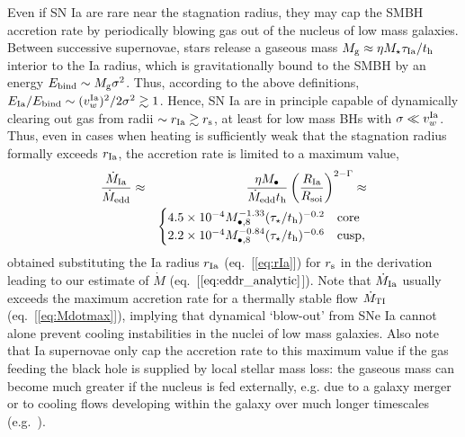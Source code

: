 \documentclass[usenatbib,fleqn]{mn2e}
\newcommand{\Mbheight}{M_{\bullet,8}}
\begin{document}
Even if SN Ia are rare near the stagnation radius, they may cap the
SMBH accretion rate by periodically blowing gas out of the nucleus of
low mass galaxies.  Between successive supernovae, stars release a
gaseous mass $M_{\rm g} \approx \eta M_{\star}\tau_{\rm Ia}/t_{\rm h}$
interior to the Ia radius, which is gravitationally bound to the SMBH
by an energy $E_{\rm bind} \sim M_{\rm g}\sigma^{2}$.  Thus, according
to the above definitions, $E_{\rm Ia}/E_{\rm bind} \sim (v_{w}^{\rm
  Ia})^{2}/2\sigma^{2} \gtrsim 1$.  Hence, SN Ia are in principle
capable of dynamically clearing out gas from radii $\sim r_{\rm Ia}
\gtrsim r_{\rm s}$, at least for low mass BHs with $\sigma \ll v^{\rm
  Ia}_{w}$.  Thus, even in cases when heating is sufficiently weak
that the stagnation radius formally exceeds $r_{\rm Ia}$, the
accretion rate is limited to a maximum value,
\begin{eqnarray}
\frac{\dot{M}_{\rm Ia}}{\dot{M}_{\rm edd}} &\approx& \frac{\eta M_{\bullet}}{\dot{M}_{\rm edd} t_{\rm h}}\left(\frac{R_{\rm Ia}}{R_{\rm soi}}\right)^{2-\Gamma} \approx \nonumber \\
 && \begin{cases}
    4.5 \times 10^{-4} M_{\bullet,8}^{-1.33}(\tau_{\star}/t_{\rm h})^{-0.2}
   & \text{core} \\
    2.2 \times 10^{-4} \Mbheight^{-0.84}(\tau_{\star}/t_{\rm h})^{-0.6}   & \text{cusp},
  \end{cases}
  \label{eq:eddr_Ia}
\end{eqnarray}
obtained substituting the Ia radius $r_{\rm Ia}$ (eq.~[\ref{eq:rIa}]) for $r_{\rm s}$ in the derivation leading to our estimate of $\dot{M}$ (eq.~[$\ref{eq:eddr_analytic}$]).  Note that $\dot{M}_{\rm Ia}$ usually exceeds the maximum accretion rate for a thermally stable flow $\dot{M}_{\rm TI}$ (eq.~[\ref{eq:Mdotmax}]), implying that dynamical `blow-out' from SNe Ia cannot alone prevent cooling instabilities in the nuclei of low mass galaxies.  Also note that Ia supernovae only cap the accretion rate to this maximum value if the gas feeding the black hole is supplied by local stellar mass loss: the gaseous mass can become much greater if the nucleus is fed externally, e.g. due to a galaxy merger or to cooling flows developing within the galaxy over much longer timescales (e.g.~\citealt{Ciotti&Ostriker07}). 
\end{document}
